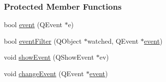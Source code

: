 \subsubsection*{Protected Member Functions}
\begin{DoxyCompactItemize}
\item 
bool \mbox{\hyperlink{classIndexerSettingDialog_a20a34151fec7c14426e8ff8b210d1cc9}{event}} (Q\+Event $\ast$e)
\item 
bool \mbox{\hyperlink{classIndexerSettingDialog_af096cfd78afd37d27487dd383ed30188}{event\+Filter}} (Q\+Object $\ast$watched, Q\+Event $\ast$\mbox{\hyperlink{classIndexerSettingDialog_a20a34151fec7c14426e8ff8b210d1cc9}{event}})
\item 
void \mbox{\hyperlink{classIndexerSettingDialog_a04091d56225031b1ca05b769f2bba105}{show\+Event}} (Q\+Show\+Event $\ast$ev)
\item 
void \mbox{\hyperlink{classIndexerSettingDialog_a2140c46d3d12396442388a3c42ba8e83}{change\+Event}} (Q\+Event $\ast$\mbox{\hyperlink{classIndexerSettingDialog_a20a34151fec7c14426e8ff8b210d1cc9}{event}})
\end{DoxyCompactItemize}
